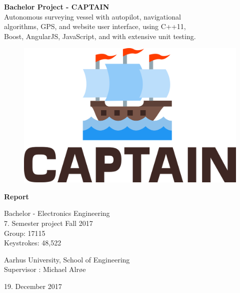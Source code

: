 \begin{titlingpage}
		
	\begin{center}
			{\huge\bfseries Bachelor Project - CAPTAIN}\\
			\vspace{20pt}
			{\large Autonomous surveying vessel with autopilot, navigational\\ algorithms, GPS, and website user interface, using C++11, \\ Boost, AngularJS, JavaScript, and with extensive unit testing.}\\
			
			\vfill
			\begin{figure}[H]
				\centering
				\includegraphics[max width=0.7\linewidth]{forside.png}
			\end{figure}
			
			\vfill
			{\Huge\bfseries Report}\\
			
			
			\vspace{20pt}
			
			{Bachelor - Electronics Engineering}\\
			{\large 7. Semester project Fall 2017}\\
			{Group: 17115}\\
			{Keystrokes: 48,522}
			
			\vspace{10pt}
			
			Aarhus University, School of Engineering\\
			Supervisor : Michael Alrøe
			\vspace{10pt}
			
			19. December 2017
	

\end{center}
\end{titlingpage}
